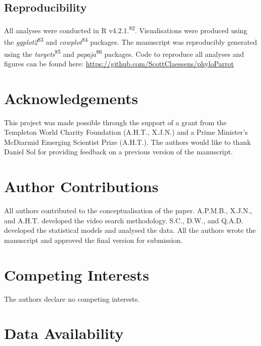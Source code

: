 \documentclass[
  man,floatsintext]{apa6}
\begin{document}
\hypertarget{reproducibility}{%
\subsection{Reproducibility}\label{reproducibility}}

All analyses were conducted in R v4.2.1.\textsuperscript{82}. Visualisations were produced using the \emph{ggplot2}\textsuperscript{83} and \emph{cowplot}\textsuperscript{84} packages. The manuscript was reproducibly generated using the \emph{targets}\textsuperscript{85} and \emph{papaja}\textsuperscript{86} packages. Code to reproduce all analyses and figures can be found here: \url{https://github.com/ScottClaessens/phyloParrot}

\newpage
\nolinenumbers

\hypertarget{acknowledgements}{%
\section{Acknowledgements}\label{acknowledgements}}

This project was made possible through the support of a grant from the Templeton World Charity Foundation (A.H.T., X.J.N.) and a Prime Minister's McDiarmid Emerging Scientist Prize (A.H.T.). The authors would like to thank Daniel Sol for providing feedback on a previous version of the manuscript.

\hypertarget{author-contributions}{%
\section{Author Contributions}\label{author-contributions}}

All authors contributed to the conceptualisation of the paper. A.P.M.B., X.J.N., and A.H.T. developed the video search methodology. S.C., D.W., and Q.A.D. developed the statistical models and analysed the data. All the authors wrote the manuscript and approved the final version for submission.

\hypertarget{competing-interests}{%
\section{Competing Interests}\label{competing-interests}}

The authors declare no competing interests.

\hypertarget{data-availability}{%
\section{Data Availability}\label{data-availability}}
\end{document}
